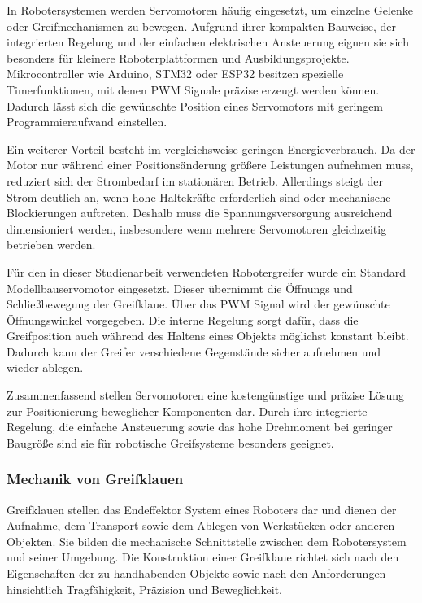 In Robotersystemen werden Servomotoren häufig eingesetzt, um einzelne Gelenke oder Greifmechanismen zu bewegen. Aufgrund ihrer kompakten Bauweise, der integrierten Regelung und der einfachen elektrischen Ansteuerung eignen sie sich besonders für kleinere Roboterplattformen und Ausbildungsprojekte. Mikrocontroller wie Arduino, STM32 oder ESP32 besitzen spezielle Timerfunktionen, mit denen PWM Signale präzise erzeugt werden können. Dadurch lässt sich die gewünschte Position eines Servomotors mit geringem Programmieraufwand einstellen.

Ein weiterer Vorteil besteht im vergleichsweise geringen Energieverbrauch. Da der Motor nur während einer Positionsänderung größere Leistungen aufnehmen muss, reduziert sich der Strombedarf im stationären Betrieb. Allerdings steigt der Strom deutlich an, wenn hohe Haltekräfte erforderlich sind oder mechanische Blockierungen auftreten. Deshalb muss die Spannungsversorgung ausreichend dimensioniert werden, insbesondere wenn mehrere Servomotoren gleichzeitig betrieben werden.

Für den in dieser Studienarbeit verwendeten Robotergreifer wurde ein Standard Modellbauservomotor eingesetzt. Dieser übernimmt die Öffnungs und Schließbewegung der Greifklaue. Über das PWM Signal wird der gewünschte Öffnungswinkel vorgegeben. Die interne Regelung sorgt dafür, dass die Greifposition auch während des Haltens eines Objekts möglichst konstant bleibt. Dadurch kann der Greifer verschiedene Gegenstände sicher aufnehmen und wieder ablegen.

Zusammenfassend stellen Servomotoren eine kostengünstige und präzise Lösung zur Positionierung beweglicher Komponenten dar. Durch ihre integrierte Regelung, die einfache Ansteuerung sowie das hohe Drehmoment bei geringer Baugröße sind sie für robotische Greifsysteme besonders geeignet.

\subsubsection*{Mechanik von Greifklauen}

Greifklauen stellen das Endeffektor System eines Roboters dar und dienen der Aufnahme, dem Transport sowie dem Ablegen von Werkstücken oder anderen Objekten. Sie bilden die mechanische Schnittstelle zwischen dem Robotersystem und seiner Umgebung. Die Konstruktion einer Greifklaue richtet sich nach den Eigenschaften der zu handhabenden Objekte sowie nach den Anforderungen hinsichtlich Tragfähigkeit, Präzision und Beweglichkeit.

